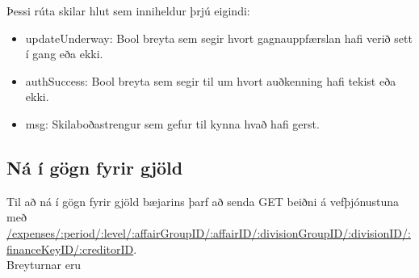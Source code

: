 \documentclass{article}
\theoremstyle{blueP}
\theoremstyle{greenS}
\begin{document}
Þessi rúta skilar hlut sem inniheldur þrjú eigindi:
\begin{itemize}
    \item updateUnderway: Bool breyta sem segir hvort gagnauppfærslan hafi verið sett í gang eða ekki.
    \item authSuccess: Bool breyta sem segir til um hvort auðkenning hafi tekist eða ekki.
    \item msg: Skilaboðastrengur sem gefur til kynna hvað hafi gerst.
\end{itemize}
    
\subsection{Ná í gögn fyrir gjöld}
Til að ná í gögn fyrir gjöld bæjarins þarf að senda GET beiðni á vefþjónustuna með \\ \url{/expenses/:period/:level/:affairGroupID/:affairID/:divisionGroupID/:divisionID/:financeKeyID/:creditorID}.
\\ Breyturnar eru
\end{document}
